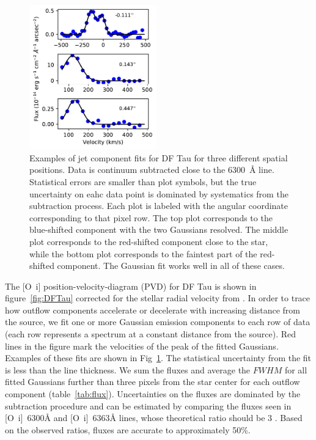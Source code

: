 \documentclass[twocolumn,trackchanges]{aastex63}
\begin{document}
\begin{figure}[h!]
\begin{center}
\includegraphics[width=0.49\textwidth]{Jet_Fit.pdf}
\caption{Examples of jet component fits for DF Tau for three different
    spatial positions. Data is continuum subtracted close to the 6300~\AA{} line. Statistical errors are smaller than plot symbols, but the true uncertainty on eahc data point is dominated by systematics from the subtraction process. Each plot is labeled with the angular coordinate corresponding to that pixel row. The top plot corresponds to the blue-shifted component with the two Gaussians resolved. The middle plot corresponds to the red-shifted component close to the star, while the bottom plot corresponds to the faintest part of the red-shifted component. The Gaussian fit works well in all of these cases. 
\label{fig:Jet_Fit}
}
\end{center}
\end{figure}

The [O~{\sc i}] position-velocity-diagram (PVD) for DF Tau is shown in figure~\ref{fig:DFTau}
corrected for the stellar radial velocity from \citet{2006AstL...32..759G}.
In order to trace how outflow components accelerate or decelerate with increasing distance from the source, we fit one or more Gaussian emission components to each row of data (each row represents a spectrum at a constant distance from the source). Red lines in the figure mark the
  velocities of the peak of the fitted Gaussians. Examples of these fits are shown in
Fig~\ref{fig:Jet_Fit}. The statistical uncertainty from the fit
is less than the line thickness.
We sum the fluxes and average the $FWHM$ for all fitted Gaussians
further than three pixels from the star center for each outflow component 
(table~\ref{tab:flux}). Uncertainties on the fluxes are dominated by the
subtraction procedure and can be estimated by comparing the fluxes seen in
[O~{\sc i}]~6300\AA{} and [O~{\sc i}]~6363\AA{} lines, whose theoretical ratio
should be 3 \citep{2000MNRAS.312..813S}. Based on the observed ratios, fluxes
are accurate to approximately 50\%.
\end{document}

